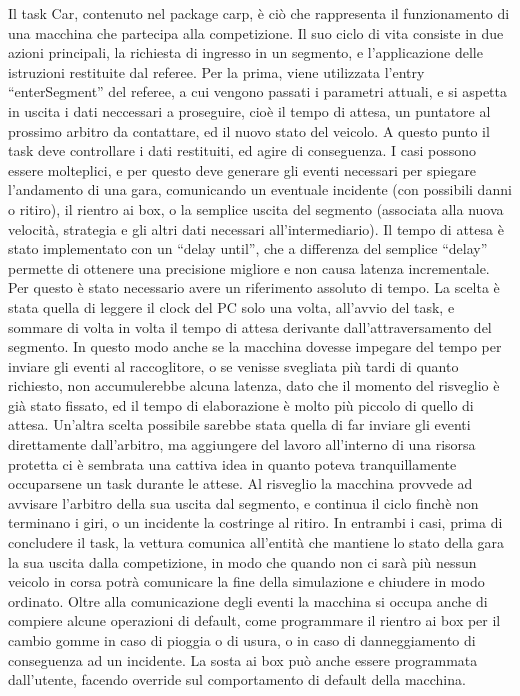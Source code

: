 Il task Car, contenuto nel package car\textunderscore p, è ciò che rappresenta il funzionamento di una macchina che partecipa alla competizione.
Il suo ciclo di vita consiste in due azioni principali, la richiesta di ingresso in un segmento, e l’applicazione delle istruzioni restituite dal referee.
Per la prima, viene utilizzata l’entry “enterSegment” del referee, a cui vengono passati i parametri attuali, e si aspetta in uscita i dati neccessari a proseguire, cioè il tempo di attesa, un puntatore al prossimo arbitro da contattare, ed il nuovo stato del veicolo.
A questo punto il task deve controllare i dati restituiti, ed agire di conseguenza. I casi possono essere molteplici, e per questo deve generare gli eventi necessari per spiegare l’andamento di una gara, comunicando un eventuale incidente (con possibili danni o ritiro), il rientro ai box, o la semplice uscita del segmento (associata alla nuova velocità, strategia e gli altri dati necessari all’intermediario).
Il tempo di attesa è stato implementato con un “delay until”, che a differenza del semplice “delay” permette di ottenere una precisione migliore e non causa latenza incrementale. Per questo è stato necessario avere un riferimento assoluto di tempo. La scelta è stata quella di leggere il clock del PC solo una volta, all’avvio del task, e sommare di volta in volta il tempo di attesa derivante dall’attraversamento del segmento.
In questo modo anche se la macchina dovesse impegare del tempo per inviare gli eventi al raccoglitore, o se venisse svegliata più tardi di quanto richiesto, non accumulerebbe alcuna latenza, dato che il momento del risveglio è già stato fissato, ed il tempo di elaborazione è molto più piccolo di quello di attesa.
Un’altra scelta possibile sarebbe stata quella di far inviare gli eventi direttamente dall’arbitro, ma aggiungere del lavoro all’interno di una risorsa protetta ci è sembrata una cattiva idea in quanto poteva tranquillamente occuparsene un task durante le attese.
Al risveglio la macchina provvede ad avvisare l’arbitro della sua uscita dal segmento, e continua il ciclo finchè non terminano i giri, o un incidente la costringe al ritiro. In entrambi i casi, prima di concludere il task, la vettura comunica all’entità che mantiene lo stato della gara la sua uscita dalla competizione, in modo che quando non ci sarà più nessun veicolo in corsa potrà comunicare la fine della simulazione e chiudere in modo ordinato.
Oltre alla comunicazione degli eventi la macchina si occupa anche di compiere alcune operazioni di default, come programmare il rientro ai box per il cambio gomme in caso di pioggia o di usura, o in caso di danneggiamento di conseguenza ad un incidente. La sosta ai box può anche essere programmata dall’utente, facendo override sul comportamento di default della macchina.

